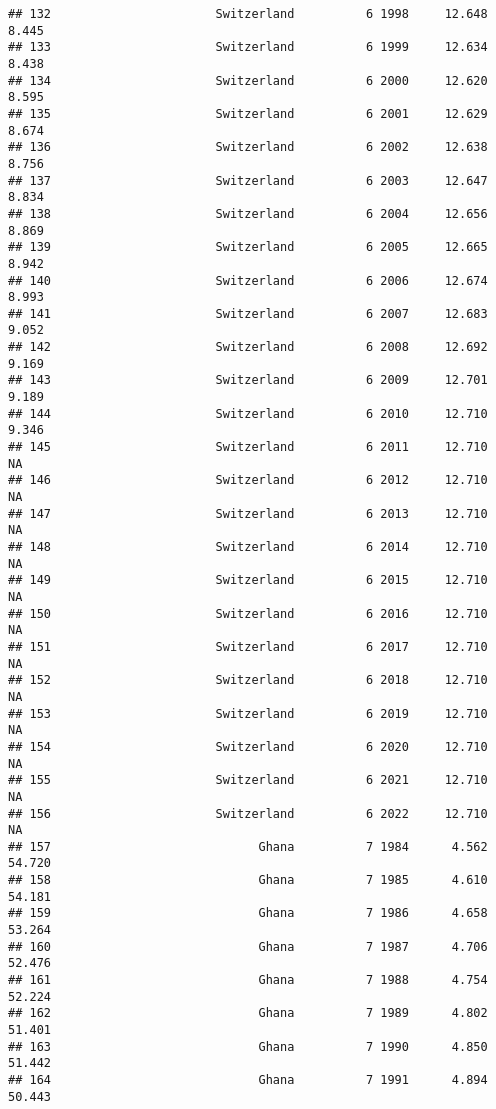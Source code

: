\documentclass[
]{article}
\begin{document}
\begin{verbatim}
## 132                       Switzerland          6 1998     12.648      8.445
## 133                       Switzerland          6 1999     12.634      8.438
## 134                       Switzerland          6 2000     12.620      8.595
## 135                       Switzerland          6 2001     12.629      8.674
## 136                       Switzerland          6 2002     12.638      8.756
## 137                       Switzerland          6 2003     12.647      8.834
## 138                       Switzerland          6 2004     12.656      8.869
## 139                       Switzerland          6 2005     12.665      8.942
## 140                       Switzerland          6 2006     12.674      8.993
## 141                       Switzerland          6 2007     12.683      9.052
## 142                       Switzerland          6 2008     12.692      9.169
## 143                       Switzerland          6 2009     12.701      9.189
## 144                       Switzerland          6 2010     12.710      9.346
## 145                       Switzerland          6 2011     12.710         NA
## 146                       Switzerland          6 2012     12.710         NA
## 147                       Switzerland          6 2013     12.710         NA
## 148                       Switzerland          6 2014     12.710         NA
## 149                       Switzerland          6 2015     12.710         NA
## 150                       Switzerland          6 2016     12.710         NA
## 151                       Switzerland          6 2017     12.710         NA
## 152                       Switzerland          6 2018     12.710         NA
## 153                       Switzerland          6 2019     12.710         NA
## 154                       Switzerland          6 2020     12.710         NA
## 155                       Switzerland          6 2021     12.710         NA
## 156                       Switzerland          6 2022     12.710         NA
## 157                             Ghana          7 1984      4.562     54.720
## 158                             Ghana          7 1985      4.610     54.181
## 159                             Ghana          7 1986      4.658     53.264
## 160                             Ghana          7 1987      4.706     52.476
## 161                             Ghana          7 1988      4.754     52.224
## 162                             Ghana          7 1989      4.802     51.401
## 163                             Ghana          7 1990      4.850     51.442
## 164                             Ghana          7 1991      4.894     50.443

\end{verbatim}
\end{document}

